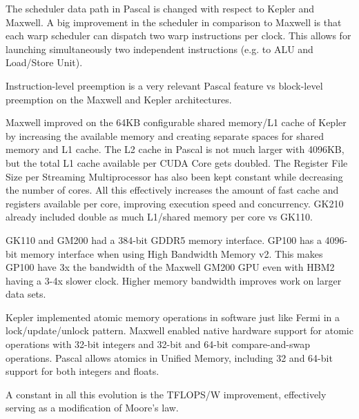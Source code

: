 The scheduler data path in Pascal is changed with respect to Kepler and Maxwell.
A big improvement in the scheduler in comparison to Maxwell is that each warp scheduler can dispatch two warp instructions per clock.
This allows for launching simultaneously two independent instructions (e.g. to ALU and Load/Store Unit).

Instruction-level preemption is a very relevant Pascal feature vs block-level preemption on the Maxwell and Kepler architectures.

Maxwell improved on the 64KB configurable shared memory/L1 cache of Kepler by increasing the available memory and creating separate spaces for shared memory and L1 cache.
The L2 cache in Pascal is not much larger with 4096KB, but the total L1 cache available per CUDA Core gets doubled.
The Register File Size per Streaming Multiprocessor has also been kept constant while decreasing the number of cores.
All this effectively increases the amount of fast cache and registers available per core, improving execution speed and concurrency.
GK210 already included double as much L1/shared memory per core vs GK110.

GK110 and GM200 had a 384-bit GDDR5 memory interface.
GP100 has a 4096-bit memory interface when using High Bandwidth Memory v2.
This makes GP100 have 3x the bandwidth of the Maxwell GM200 GPU even with HBM2 having a 3-4x slower clock.
Higher memory bandwidth improves work on larger data sets.

Kepler implemented atomic memory operations in software just like Fermi in a lock/update/unlock pattern.
Maxwell enabled native hardware support for atomic operations with 32-bit integers and 32-bit and 64-bit compare-and-swap operations.
Pascal allows atomics in Unified Memory, including 32 and 64-bit support for both integers and floats.

A constant in all this evolution is the TFLOPS/W improvement, effectively serving as a modification of Moore's law.
